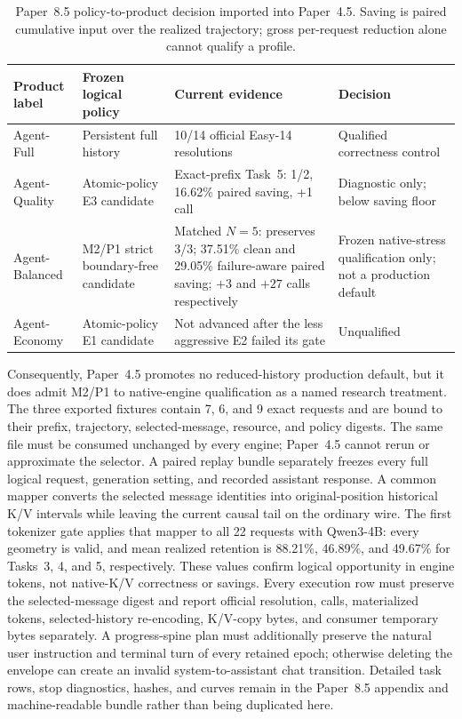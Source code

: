 \documentclass[11pt]{article}
\begin{document}
\begin{table}[H]
\centering
\small
\caption{Paper~8.5 policy-to-product decision imported into Paper~4.5.  Saving
is paired cumulative input over the realized trajectory; gross per-request
reduction alone cannot qualify a profile.}
\begin{tabularx}{\linewidth}{p{.18\linewidth}p{.25\linewidth}Yp{.20\linewidth}}
\toprule
Product label & Frozen logical policy & Current evidence & Decision \\
\midrule
Agent-Full & Persistent full history & 10/14 official Easy-14 resolutions &
Qualified correctness control \\
Agent-Quality & Atomic-policy E3 candidate & Exact-prefix Task~5: 1/2, 16.62\% paired
saving, +1 call & Diagnostic only; below saving floor \\
Agent-Balanced & M2/P1 strict boundary-free candidate & Matched $N=5$:
preserves 3/3; 37.51\% clean and 29.05\% failure-aware paired saving; $+3$ and
$+27$ calls respectively & Frozen native-stress qualification only; not a
production default \\
Agent-Economy & Atomic-policy E1 candidate & Not advanced after the less aggressive
E2 failed its gate & Unqualified \\
\bottomrule
\end{tabularx}
\label{tab:paper85-agent-profile-transfer}
\end{table}

Consequently, Paper~4.5 promotes no reduced-history production default, but it
does admit M2/P1 to native-engine qualification as a named research treatment.
The three exported fixtures contain 7, 6, and 9 exact requests and are bound to
their prefix, trajectory, selected-message, resource, and policy digests.  The
same file must be consumed unchanged by every engine; Paper~4.5 cannot rerun or
approximate the selector.  A paired replay bundle separately freezes every
full logical request, generation setting, and recorded assistant response.  A
common mapper converts the selected message identities into original-position
historical K/V intervals while leaving the current causal tail on the ordinary
wire.  The first tokenizer gate applies that mapper to all 22 requests with
Qwen3-4B: every geometry is valid, and mean realized retention is 88.21\%,
46.89\%, and 49.67\% for Tasks~3, 4, and 5, respectively.  These values confirm
logical opportunity in engine tokens, not native-K/V correctness or savings.
Every execution row must preserve the selected-message digest and
report official resolution, calls, materialized tokens, selected-history
re-encoding, K/V-copy bytes, and consumer temporary bytes separately.  A
progress-spine plan must additionally preserve the natural user instruction
and terminal turn of every retained epoch; otherwise deleting the envelope can
create an invalid system-to-assistant chat transition.  Detailed task rows,
stop diagnostics, hashes, and curves remain in the Paper~8.5 appendix and
machine-readable bundle rather than being duplicated here.
\end{document}
